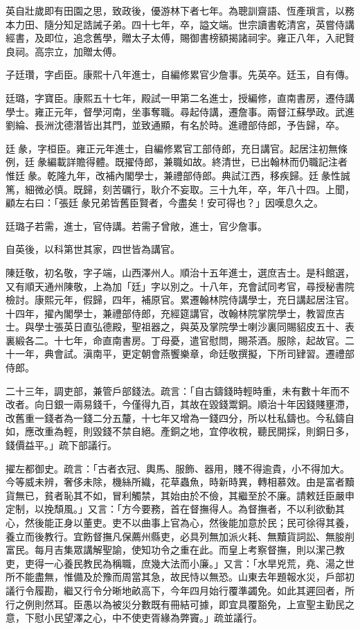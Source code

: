 \begin{pinyinscope}
英自壯歲即有田園之思，致政後，優游林下者七年。為聰訓齋語、恆產瑣言，以務本力田、隨分知足誥誡子弟。四十七年，卒，謚文端。世宗讀書乾清宮，英嘗侍講經書，及即位，追念舊學，贈太子太傅，賜御書榜額揭諸祠宇。雍正八年，入祀賢良祠。高宗立，加贈太傅。

子廷瓚，字卣臣。康熙十八年進士，自編修累官少詹事。先英卒。廷玉，自有傳。

廷璐，字寶臣。康熙五十七年，殿試一甲第二名進士，授編修，直南書房，遷侍講學士。雍正元年，督學河南，坐事奪職。尋起侍講，遷詹事。兩督江蘇學政。武進劉綸、長洲沈德潛皆出其門，並致通顯，有名於時。進禮部侍郎，予告歸，卒。

廷彖，字桓臣。雍正元年進士，自編修累官工部侍郎，充日講官。起居注初無條例，廷彖編載詳贍得體。既擢侍郎，兼職如故。終清世，已出翰林而仍職記注者惟廷彖。乾隆九年，改補內閣學士，兼禮部侍郎。典試江西，移疾歸。廷彖性誠篤，細微必慎。既歸，刻苦礪行，耿介不妄取。三十九年，卒，年八十四。上聞，顧左右曰：「張廷彖兄弟皆舊臣賢者，今盡矣！安可得也？」因嘆息久之。

廷璐子若需，進士，官侍講。若需子曾敞，進士，官少詹事。

自英後，以科第世其家，四世皆為講官。

陳廷敬，初名敬，字子端，山西澤州人。順治十五年進士，選庶吉士。是科館選，又有順天通州陳敬，上為加「廷」字以別之。十八年，充會試同考官，尋授秘書院檢討。康熙元年，假歸，四年，補原官。累遷翰林院侍講學士，充日講起居注官。十四年，擢內閣學士，兼禮部侍郎，充經筵講官，改翰林院掌院學士，教習庶吉士。與學士張英日直弘德殿，聖祖器之，與英及掌院學士喇沙裏同賜貂皮五十、表裏緞各二。十七年，命直南書房。丁母憂，遣官慰問，賜茶酒。服除，起故官。二十一年，典會試。滇南平，更定朝會燕饗樂章，命廷敬撰擬，下所司肄習。遷禮部侍郎。

二十三年，調吏部，兼管戶部錢法。疏言：「自古鑄錢時輕時重，未有數十年而不改者。向日銀一兩易錢千，今僅得九百，其故在毀錢鬻銅。順治十年因錢賤壅滯，改舊重一錢者為一錢二分五釐，十七年又增為一錢四分，所以杜私鑄也。今私鑄自如，應改重為輕，則毀錢不禁自絕。產銅之地，宜停收稅，聽民開採，則銅日多，錢價益平。」疏下部議行。

擢左都御史。疏言：「古者衣冠、輿馬、服飾、器用，賤不得逾貴，小不得加大。今等威未辨，奢侈未除，機絲所織，花草蟲魚，時新時異，轉相慕效。由是富者黷貨無已，貧者恥其不如，冒利觸禁，其始由於不儉，其繼至於不廉。請敕廷臣嚴申定制，以挽頹風。」又言：「方今要務，首在督撫得人。為督撫者，不以利欲動其心，然後能正身以董吏。吏不以曲事上官為心，然後能加意於民；民可徐得其養，養立而後教行。宜飭督撫凡保薦州縣吏，必具列無加派火耗、無黷貨詞訟、無朘削富民。每月吉集眾講解聖諭，使知功令之重在此。而皇上考察督撫，則以潔己教吏，吏得一心養民教民為稱職，庶幾大法而小廉。」又言：「水旱兇荒，堯、湯之世所不能盡無，惟備及於豫而周當其急，故民恃以無恐。山東去年題報水災，戶部初議行令履勘，繼又行令分晰地畝高下，今年四月始行覆準蠲免。如此其遲回者，所行之例則然耳。臣愚以為被災分數既有冊結可據，即宜具覆豁免，上宣聖主勤民之意，下慰小民望澤之心，中不使吏胥緣為弊竇。」疏並議行。


\end{pinyinscope}
